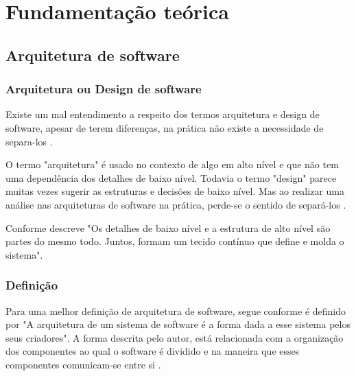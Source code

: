 \chapter{Fundamentação teórica}

\section{Arquitetura de software}
    
    \subsection{Arquitetura ou Design de software}
    
        \par Existe um mal entendimento a respeito dos termos arquitetura e design de software, apesar de terem diferenças, na prática não existe a necessidade de separa-los \cite{livro:martin:cleanarch}.
        
        \par O termo "arquitetura"\hspace{0.1cm} é usado no contexto de algo em alto nível e que não tem uma dependência dos detalhes de baixo nível. Todavia o termo "design"\hspace{0.1cm} parece muitas vezes sugerir as estruturas e decisões de baixo nível. Mas ao realizar uma análise nas arquiteturas de software na prática, perde-se o sentido de separá-los \cite{livro:martin:cleanarch}.
    
        \par Conforme descreve  "Os detalhes de baixo nível e a estrutura de alto nível são partes do mesmo todo. Juntos, formam um tecido contínuo que define e molda o sistema".
        
        
    \subsection{Definição}
    
        \par Para uma melhor definição de arquitetura de software, segue conforme é definido por  "A arquitetura de um sistema de software é a forma dada a esse sistema pelos seus criadores". A forma descrita pelo autor, está relacionada com a organização dos componentes ao qual o software é dividido e na maneira que esses componentes comunicam-se entre si \cite{livro:martin:cleanarch}.
        
